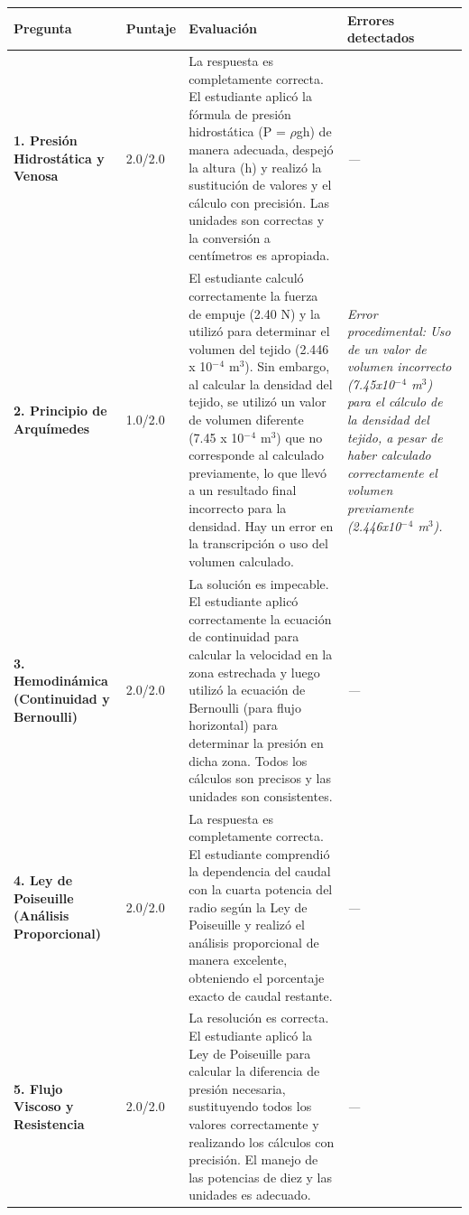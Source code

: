 \documentclass[11pt,a4paper]{article}
\begin{document}
\begin{longtable}{>{\bfseries}p{2.8cm} p{1.6cm} p{7.0cm} p{2.8cm}}
  \toprule
  \textbf{Pregunta} & \textbf{Puntaje} & \textbf{Evaluación} & \textbf{Errores detectados} \\
  \midrule
  \endhead
  \bottomrule
  \endfoot
    \textbf{1. Presión Hidrostática y Venosa} & 2.0/2.0 & La respuesta es completamente correcta. El estudiante aplicó la fórmula de presión hidrostática (P = $\rho$gh) de manera adecuada, despejó la altura (h) y realizó la sustitución de valores y el cálculo con precisión. Las unidades son correctas y la conversión a centímetros es apropiada. & \textit{---} \\
    \midrule
    \textbf{2. Principio de Arquímedes} & 1.0/2.0 & El estudiante calculó correctamente la fuerza de empuje (2.40 N) y la utilizó para determinar el volumen del tejido (2.446 x 10$^{-}$$^{4}$ m$^{3}$). Sin embargo, al calcular la densidad del tejido, se utilizó un valor de volumen diferente (7.45 x 10$^{-}$$^{4}$ m$^{3}$) que no corresponde al calculado previamente, lo que llevó a un resultado final incorrecto para la densidad. Hay un error en la transcripción o uso del volumen calculado. & \textit{Error procedimental: Uso de un valor de volumen incorrecto (7.45x10$^{-}$$^{4}$ m$^{3}$) para el cálculo de la densidad del tejido, a pesar de haber calculado correctamente el volumen previamente (2.446x10$^{-}$$^{4}$ m$^{3}$).} \\
    \midrule
    \textbf{3. Hemodinámica (Continuidad y Bernoulli)} & 2.0/2.0 & La solución es impecable. El estudiante aplicó correctamente la ecuación de continuidad para calcular la velocidad en la zona estrechada y luego utilizó la ecuación de Bernoulli (para flujo horizontal) para determinar la presión en dicha zona. Todos los cálculos son precisos y las unidades son consistentes. & \textit{---} \\
    \midrule
    \textbf{4. Ley de Poiseuille (Análisis Proporcional)} & 2.0/2.0 & La respuesta es completamente correcta. El estudiante comprendió la dependencia del caudal con la cuarta potencia del radio según la Ley de Poiseuille y realizó el análisis proporcional de manera excelente, obteniendo el porcentaje exacto de caudal restante. & \textit{---} \\
    \midrule
    \textbf{5. Flujo Viscoso y Resistencia} & 2.0/2.0 & La resolución es correcta. El estudiante aplicó la Ley de Poiseuille para calcular la diferencia de presión necesaria, sustituyendo todos los valores correctamente y realizando los cálculos con precisión. El manejo de las potencias de diez y las unidades es adecuado. & \textit{---} \\
    \midrule
\end{longtable}
\end{document}
